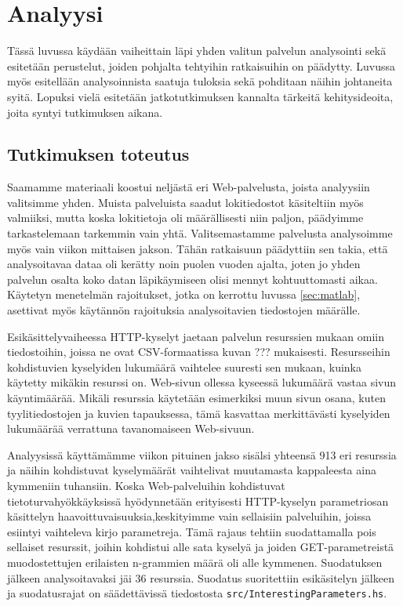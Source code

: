 
\chapter{Analyysi}

Tässä luvussa käydään vaiheittain läpi yhden valitun palvelun analysointi sekä esitetään perustelut, joiden pohjalta tehtyihin ratkaisuihin on päädytty. 
Luvussa myös esitellään analysoinnista saatuja tuloksia sekä pohditaan näihin johtaneita syitä. Lopuksi vielä esitetään jatkotutkimuksen kannalta 
tärkeitä kehitysideoita, joita syntyi tutkimuksen aikana. 
 
\section{Tutkimuksen toteutus}

Saamamme materiaali koostui neljästä eri Web-palvelusta, joista analyysiin valitsimme yhden. Muista palveluista saadut lokitiedostot käsiteltiin
myös valmiiksi, mutta koska lokitietoja oli määrällisesti niin paljon, päädyimme tarkastelemaan tarkemmin vain yhtä. Valitsemastamme palvelusta
analysoimme myös vain viikon mittaisen jakson. Tähän ratkaisuun päädyttiin sen takia, että analysoitavaa dataa oli kerätty noin puolen vuoden ajalta,
joten jo yhden palvelun osalta koko datan läpikäymiseen olisi mennyt kohtuuttomasti aikaa. Käytetyn menetelmän rajoitukset, jotka on kerrottu luvussa \ref{sec:matlab},
asettivat myös käytännön rajoituksia analysoitavien tiedostojen määrälle.
 
Esikäsittelyvaiheessa HTTP-kyselyt jaetaan palvelun resurssien mukaan
omiin tiedostoihin, joissa ne ovat CSV-formaatissa kuvan ???
mukaisesti.  Resursseihin kohdistuvien kyselyiden lukumäärä vaihtelee
suuresti sen mukaan, kuinka käytetty mikäkin resurssi on. Web-sivun
ollessa kyseessä lukumäärä vastaa sivun käyntimäärää. Mikäli resurssia
käytetään esimerkiksi muun sivun osana, kuten tyylitiedostojen ja
kuvien tapauksessa, tämä kasvattaa merkittävästi kyselyiden lukumäärää
verrattuna tavanomaiseen Web-sivuun.

Analyysissä käyttämämme viikon pituinen jakso sisälsi yhteensä 913 eri
resurssia ja näihin kohdistuvat kyselymäärät vaihtelivat muutamasta
kappaleesta aina kymmeniin tuhansiin. Koska Web-palveluihin kohdistuvat 
tietoturvahyökkäyksissä hyödynnetään erityisesti HTTP-kyselyn parametriosan 
käsittelyn haavoittuvaisuuksia,keskityimme vain sellaisiin palveluihin, joissa 
esiintyi vaihteleva kirjo parametreja. Tämä rajaus tehtiin suodattamalla pois sellaiset
resurssit, joihin kohdistui alle sata kyselyä ja joiden
GET-parametreistä muodostettujen erilaisten n-grammien määrä oli alle
kymmenen. Suodatuksen jälkeen analysoitavaksi jäi 36
resurssia. Suodatus suoritettiin esikäsitelyn jälkeen ja
suodatusrajat on säädettävissä tiedostosta
\texttt{src/InterestingParameters.hs}.

